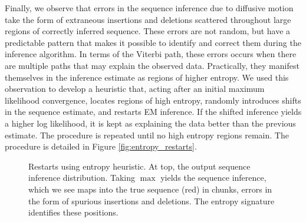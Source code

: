 \documentclass{biophys_letter}
\begin{document}
Finally, we observe that errors in the sequence inference due to diffusive motion take the form of extraneous insertions and deletions scattered throughout large regions of correctly inferred sequence.
These errors are not random, but have a predictable pattern that makes it possible to identify and correct them during the inference algorithm.
In terms of the Viterbi path, these errors occurs when there are multiple paths that may explain the observed data. 
Practically, they manifest themselves in the inference estimate as regions of higher entropy.
We used this observation to develop a heuristic that, acting after an initial maximum likelihood convergence, locates regions of high entropy, randomly introduces shifts in the sequence estimate, and restarts EM inference.
If the shifted inference yields a higher log likelihood, it is kept as explaining the data better than the previous estimate.
The procedure is repeated until no high entropy regions remain.
The procedure is detailed in Figure \ref{fig:entropy_restarts}.

\begin{figure}
  \caption{Restarts using entropy heuristic. At top, the output sequence inference distribution. Taking $\max$ yields the sequence inference, which we see maps into the true sequence (red) in chunks, errors in the form of spurious insertions and deletions. The entropy signature identifies these positions.}
\label{fig:inference_output}
\end{figure}
\end{document}
